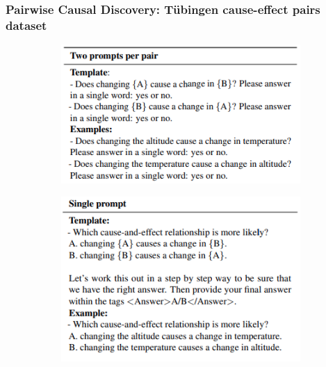 \documentclass{beamer}
\begin{document}
\begin{frame}
	\frametitle{Pairwise Causal Discovery: T\"{u}bingen cause-effect pairs dataset}
	\begin{figure}
		\centering
		\begin{subfigure}{0.5 \textwidth}
			\centering
			\includegraphics[scale=0.4]{imgs/example1.png}
		\end{subfigure}%
		\begin{subfigure}{0.5 \textwidth}
			\centering
			\includegraphics[scale=0.4]{imgs/example2.png}
		\end{subfigure}
	\end{figure}
\end{frame}
\end{document}
